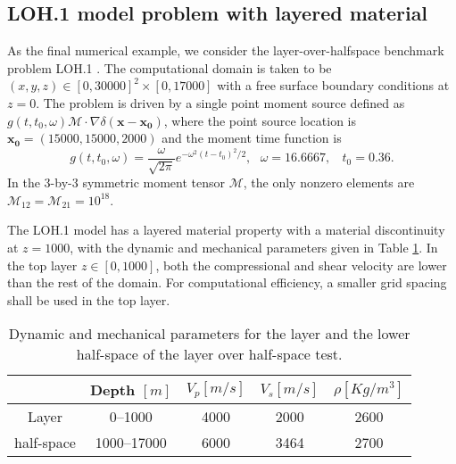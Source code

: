 \subsection{LOH.1 model problem with layered material}
As the final numerical example, we consider the layer-over-halfspace benchmark problem LOH.1 \cite{Day2001}. The computational domain is taken to be $(x,y,z)\in[0,30000]^2\times[0,17000]$ with a free surface boundary conditions at $z=0$.   The problem is driven by a single point moment source defined as 
$g(t,t_0,\omega) \mathcal{M} \cdot \nabla\delta (\mathbf{x}-\mathbf{x_0})$, 
where the point source location is $\mathbf{x_0}= (15000, 15000, 2000)$  and the moment time function is
\[g(t,t_0,\omega) = \frac{\omega}{\sqrt{2\pi}}e^{-\omega^2(t - t_0)^2/2}, \ \ \ \omega = 16.6667,\ \ \ \ t_0 = 0.36.\]
In the 3-by-3 symmetric moment tensor $\mathcal{M}$, the only nonzero elements are $\mathcal{M}_{12}=\mathcal{M}_{21}=10^{18}$.

The LOH.1 model has a layered material property with a material discontinuity at $z=1000$, with the dynamic and mechanical parameters given in Table \ref{material_parameter}. In the top layer $z\in [0, 1000]$, both the compressional and shear velocity are lower than the rest of the domain. For computational efficiency, a smaller grid spacing shall be used in the top layer. 

\begin{table}[htbp]
	\begin{center}
		\begin{tabular}{c c c c c}
			\hline
			~   & Depth $[m]$& $V_p[m/s]$ & $V_s [m/s]$ & $\rho[Kg/m^3]$ \\
			\hline
			Layer&0--1000& 4000& 2000& 2600\\
			half-space &1000--17000 & 6000 & 3464& 2700\\
			\hline 
		\end{tabular}
	\end{center}
	\caption{Dynamic and mechanical parameters for the layer and the lower half-space of the layer over half-space test.}\label{material_parameter}
\end{table} 

